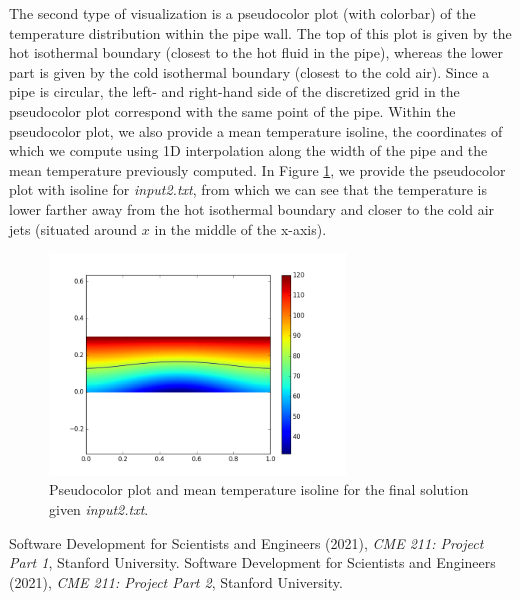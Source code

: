 \documentclass[12pt, a4paper]{article}
\begin{document}
The second type of visualization is a pseudocolor plot (with colorbar) 
of the temperature distribution within the pipe wall. The top of this 
plot is given by the hot isothermal boundary (closest to the hot fluid 
in the pipe), whereas the lower part is given by the cold isothermal 
boundary (closest to the cold air). Since a pipe is circular, the left- 
and right-hand side of the discretized grid in the pseudocolor plot 
correspond with the same point of the pipe. Within the pseudocolor 
plot, we also provide a mean temperature isoline, the coordinates of 
which we compute using 1D interpolation along the width of the pipe 
and the mean temperature previously computed. In Figure \ref{Fig: viz-plot}, 
we provide the pseudocolor plot with isoline for \textit{input2.txt}, from
which we can see that the temperature is lower farther away from the hot 
isothermal boundary and closer to the cold air jets (situated around $x$
in the middle of the x-axis). 

\begin{figure}[H]
    \centering
    \includegraphics[width=0.7\textwidth]{pseudoColorPlot.png}
    \caption{Pseudocolor plot and mean temperature isoline for the 
    final solution given \textit{input2.txt}.}
    \label{Fig: viz-plot}
\end{figure}

\begin{thebibliography}{99}
Software Development for Scientists and Engineers (2021), 
\emph{CME 211: Project Part 1}, Stanford University.
Software Development for Scientists and Engineers (2021), 
\emph{CME 211: Project Part 2}, Stanford University.

\end{thebibliography}
\end{document}
